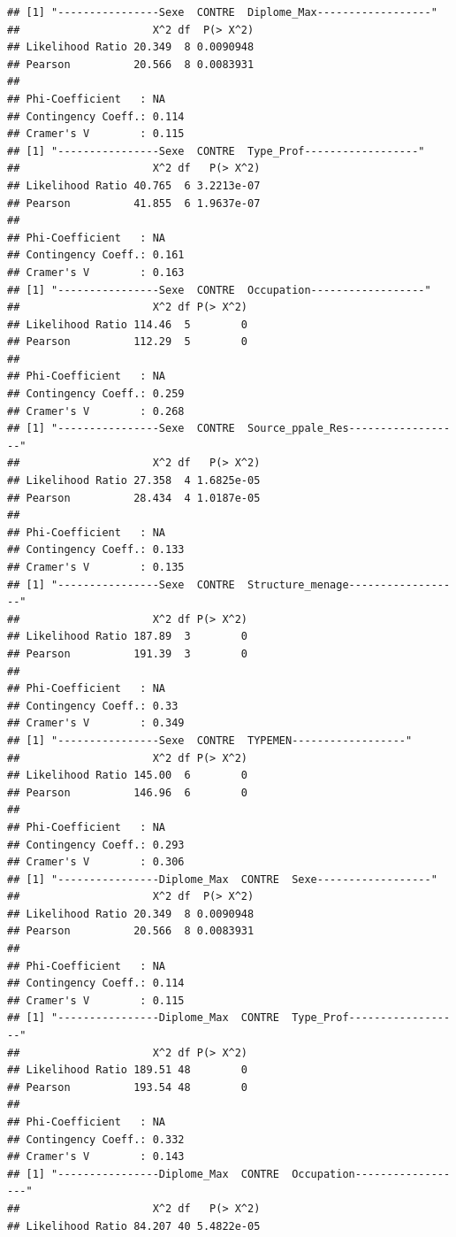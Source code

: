 \documentclass[11pt,a4paper, x11names]{article}\usepackage[]{graphicx}\usepackage[]{color}
\makeatletter
\newenvironment{kframe}{%
 \def\at@end@of@kframe{}%
 \ifinner\ifhmode%
  \def\at@end@of@kframe{\end{minipage}}%
  \begin{minipage}{\columnwidth}%
 \fi\fi%
 \def\FrameCommand##1{\hskip\@totalleftmargin \hskip-\fboxsep
 \colorbox{shadecolor}{##1}\hskip-\fboxsep
     \hskip-\linewidth \hskip-\@totalleftmargin \hskip\columnwidth}%
 \MakeFramed {\advance\hsize-\width
   \@totalleftmargin\z@ \linewidth\hsize
   \@setminipage}}%
 {\par\unskip\endMakeFramed%
 \at@end@of@kframe}
\newenvironment{knitrout}{}{} %
\makeatother
\begin{document}
\begin{knitrout}
\color{fgcolor}\begin{kframe}
\begin{verbatim}
## [1] "----------------Sexe  CONTRE  Diplome_Max------------------"
##                     X^2 df  P(> X^2)
## Likelihood Ratio 20.349  8 0.0090948
## Pearson          20.566  8 0.0083931
## 
## Phi-Coefficient   : NA 
## Contingency Coeff.: 0.114 
## Cramer's V        : 0.115 
## [1] "----------------Sexe  CONTRE  Type_Prof------------------"
##                     X^2 df   P(> X^2)
## Likelihood Ratio 40.765  6 3.2213e-07
## Pearson          41.855  6 1.9637e-07
## 
## Phi-Coefficient   : NA 
## Contingency Coeff.: 0.161 
## Cramer's V        : 0.163 
## [1] "----------------Sexe  CONTRE  Occupation------------------"
##                     X^2 df P(> X^2)
## Likelihood Ratio 114.46  5        0
## Pearson          112.29  5        0
## 
## Phi-Coefficient   : NA 
## Contingency Coeff.: 0.259 
## Cramer's V        : 0.268 
## [1] "----------------Sexe  CONTRE  Source_ppale_Res------------------"
##                     X^2 df   P(> X^2)
## Likelihood Ratio 27.358  4 1.6825e-05
## Pearson          28.434  4 1.0187e-05
## 
## Phi-Coefficient   : NA 
## Contingency Coeff.: 0.133 
## Cramer's V        : 0.135 
## [1] "----------------Sexe  CONTRE  Structure_menage------------------"
##                     X^2 df P(> X^2)
## Likelihood Ratio 187.89  3        0
## Pearson          191.39  3        0
## 
## Phi-Coefficient   : NA 
## Contingency Coeff.: 0.33 
## Cramer's V        : 0.349 
## [1] "----------------Sexe  CONTRE  TYPEMEN------------------"
##                     X^2 df P(> X^2)
## Likelihood Ratio 145.00  6        0
## Pearson          146.96  6        0
## 
## Phi-Coefficient   : NA 
## Contingency Coeff.: 0.293 
## Cramer's V        : 0.306 
## [1] "----------------Diplome_Max  CONTRE  Sexe------------------"
##                     X^2 df  P(> X^2)
## Likelihood Ratio 20.349  8 0.0090948
## Pearson          20.566  8 0.0083931
## 
## Phi-Coefficient   : NA 
## Contingency Coeff.: 0.114 
## Cramer's V        : 0.115 
## [1] "----------------Diplome_Max  CONTRE  Type_Prof------------------"
##                     X^2 df P(> X^2)
## Likelihood Ratio 189.51 48        0
## Pearson          193.54 48        0
## 
## Phi-Coefficient   : NA 
## Contingency Coeff.: 0.332 
## Cramer's V        : 0.143 
## [1] "----------------Diplome_Max  CONTRE  Occupation------------------"
##                     X^2 df   P(> X^2)
## Likelihood Ratio 84.207 40 5.4822e-05

\end{verbatim}
\end{kframe}
\end{knitrout}
\end{document}
